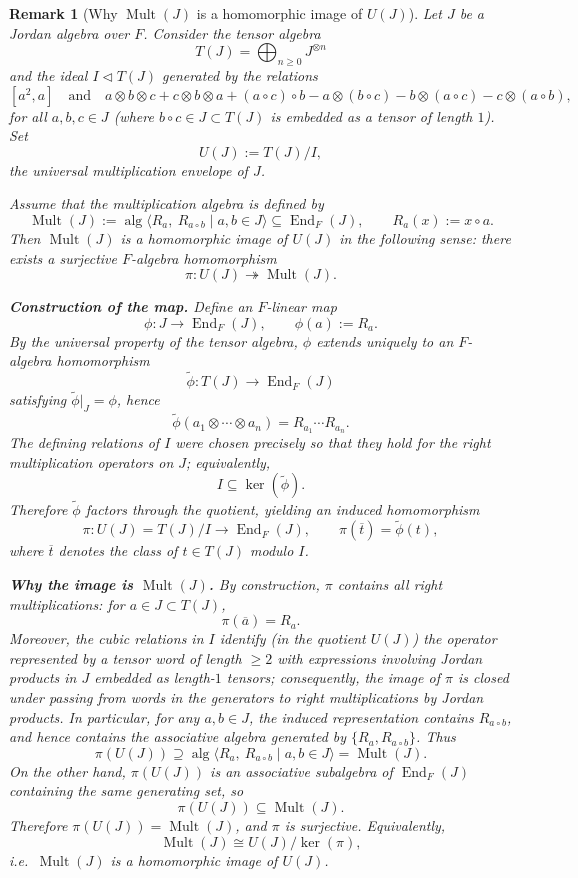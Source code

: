 \documentclass{article}
\newtheorem{remark}[theorem]{Remark}
\begin{document}
\begin{remark}[Why $\operatorname{Mult}(J)$ is a homomorphic image of $U(J)$]
Let $J$ be a Jordan algebra over $F$. Consider the tensor algebra
\[
T(J)=\bigoplus_{n\ge 0} J^{\otimes n}
\]
and the ideal $I\lhd T(J)$ generated by the relations
\[
[a^2,a]\quad\text{and}\quad
a\otimes b\otimes c+c\otimes b\otimes a+(a\circ c)\circ b
- a\otimes (b\circ c)- b\otimes (a\circ c)- c\otimes (a\circ b),
\]
for all $a,b,c\in J$ (where $b\circ c\in J\subset T(J)$ is embedded as a tensor
of length $1$). Set
\[
U(J):=T(J)/I,
\]
the \emph{universal multiplication envelope} of $J$.

Assume that the multiplication algebra is defined by
\[
\operatorname{Mult}(J):=\operatorname{alg}\langle R_a,\ R_{a\circ b}\mid a,b\in J\rangle
\subseteq \operatorname{End}_F(J),
\qquad R_a(x):=x\circ a.
\]
Then $\operatorname{Mult}(J)$ is a homomorphic image of $U(J)$ in the following sense:
there exists a surjective $F$-algebra homomorphism
\[
\pi:U(J)\twoheadrightarrow \operatorname{Mult}(J).
\]

\noindent
\textbf{Construction of the map.}
Define an $F$-linear map
\[
\phi:J\to \operatorname{End}_F(J),\qquad \phi(a):=R_a.
\]
By the universal property of the tensor algebra, $\phi$ extends uniquely to an
$F$-algebra homomorphism
\[
\widetilde\phi:T(J)\to \operatorname{End}_F(J)
\]
satisfying $\widetilde\phi|_J=\phi$, hence
\[
\widetilde\phi(a_1\otimes\cdots\otimes a_n)=R_{a_1}\cdots R_{a_n}.
\]
The defining relations of $I$ were chosen precisely so that they hold for the
right multiplication operators on $J$; equivalently,
\[
I\subseteq \ker(\widetilde\phi).
\]
Therefore $\widetilde\phi$ factors through the quotient, yielding an induced
homomorphism
\[
\pi:U(J)=T(J)/I\longrightarrow \operatorname{End}_F(J),
\qquad \pi(\overline{t})=\widetilde\phi(t),
\]
where $\overline{t}$ denotes the class of $t\in T(J)$ modulo $I$.

\noindent
\textbf{Why the image is $\operatorname{Mult}(J)$.}
By construction, $\pi$ contains all right multiplications:
for $a\in J\subset T(J)$,
\[
\pi(\overline{a})=R_a.
\]
Moreover, the cubic relations in $I$ identify (in the quotient $U(J)$) the
operator represented by a tensor word of length $\ge 2$ with expressions
involving Jordan products in $J$ embedded as length-$1$ tensors; consequently,
the image of $\pi$ is closed under passing from words in the generators
to right multiplications by Jordan products. In particular, for any $a,b\in J$,
the induced representation contains $R_{a\circ b}$, and hence contains the
associative algebra generated by $\{R_a, R_{a\circ b}\}$.
Thus
\[
\pi(U(J)) \supseteq \operatorname{alg}\langle R_a,\ R_{a\circ b}\mid a,b\in J\rangle=\operatorname{Mult}(J).
\]
On the other hand, $\pi(U(J))$ is an associative subalgebra of $\operatorname{End}_F(J)$
containing the same generating set, so
\[
\pi(U(J))\subseteq \operatorname{Mult}(J).
\]
Therefore $\pi(U(J))=\operatorname{Mult}(J)$, and $\pi$ is surjective. Equivalently,
\[
\operatorname{Mult}(J)\cong U(J)/\ker(\pi),
\]
i.e.\ $\operatorname{Mult}(J)$ is a homomorphic image of $U(J)$.
\end{remark}
\end{document}

